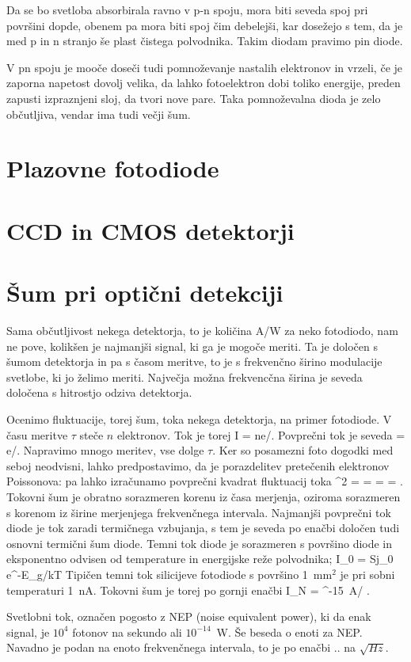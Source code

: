 Da se bo svetloba absorbirala ravno v p-n spoju, mora biti seveda spoj pri površini dopde, obenem
pa mora biti spoj čim debelejši, kar dosežejo s tem, da je med  p in n stranjo še plast
čistega polvodnika. Takim diodam pravimo pin diode. 

V pn spoju je mooče doseči tudi pomnoževanje nastalih elektronov in vrzeli, če je zaporna napetost dovolj 
velika, da lahko fotoelektron dobi toliko energije, preden zapusti izpraznjeni sloj, da tvori nove pare.
Taka pomnoževalna dioda je zelo občutljiva, vendar ima tudi večji šum.

\section{Plazovne fotodiode}
 
\section{CCD in CMOS detektorji}
 
\section{Šum pri optični detekciji}
Sama občutljivost nekega detektorja, to je količina A/W za neko fotodiodo, nam ne pove, kolikšen 
je najmanjši signal, ki ga je mogoče meriti. Ta je določen s šumom detektorja in pa s časom 
meritve, to je s frekvenčno širino modulacije svetlobe, ki jo želimo meriti. Največja 
možna frekvencčna širina je seveda določena s hitrostjo odziva detektorja.

Ocenimo fluktuacije, torej šum, toka nekega detektorja, na primer fotodiode. V času
meritve $\tau$ steče $n$ elektronov. Tok je torej
\beq
I = ne/\tau.
\eeq
Povprečni tok je seveda
\beq
{} = e/\tau.
\eeq
Napravimo mnogo meritev, vse dolge $\tau$. Ker so posamezni foto dogodki med seboj neodvisni, 
lahko predpostavimo, da je porazdelitev pretečenih elektronov Poissonova: pa lahko izračunamo
povprečni kvadrat fluktuacij toka
\beq
\sigma^2 =  =   = 
 = .
\eeq
Tokovni šum je obratno sorazmeren korenu iz časa merjenja, oziroma sorazmeren s korenom
iz širine merjenjega frekvenčnega intervala. Najmanjši povprečni tok diode je tok zaradi
termičnega vzbujanja, s tem je seveda po enačbi določen tudi osnovni termični šum diode.
Temni tok diode je sorazmeren s površino diode in eksponentno odvisen od temperature in 
energijske reže polvodnika;
\beq
I_0 = Sj_0 e^{-E_g/kT}
\eeq
Tipičen temni tok silicijeve fotodiode s površino 1~mm$^2$ je pri sobni temperaturi 1~nA. 
Tokovni šum je torej po gornji enačbi
\beq
I_N =  ^{-15}~A/ \sqrt{\Delta \nu}.
\eeq

Svetlobni tok, označen pogosto z NEP (noise equivalent power), ki da enak signal, je $10^4 $
fotonov na sekundo ali $10^{-14}$~W. Še beseda o enoti za NEP. Navadno je podan na enoto 
frekvenčnega intervala, to je po enačbi .. na $\sqrt{Hz}$. 
